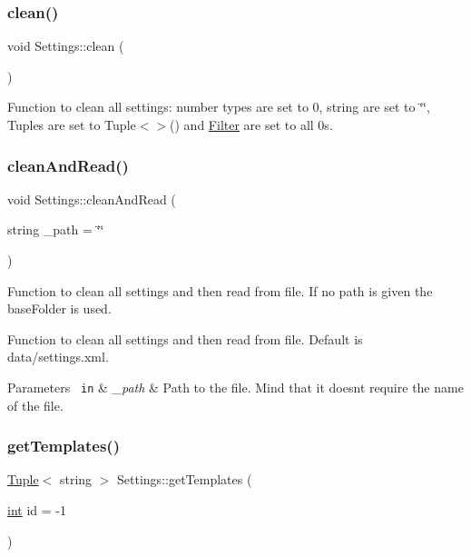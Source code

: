 \subsubsection{\texorpdfstring{clean()}{clean()}}
{\footnotesize\ttfamily void Settings\+::clean (\begin{DoxyParamCaption}{ }\end{DoxyParamCaption})}



Function to clean all settings\+: number types are set to 0, string are set to \char`\"{}\char`\"{}, Tuples are set to Tuple$<$$>$() and \mbox{\hyperlink{class_filter}{Filter}} are set to all 0s. 

\mbox{\label{class_settings_acd13c0d603d94c7c2da58cd92bc955c8}} 
\subsubsection{\texorpdfstring{cleanAndRead()}{cleanAndRead()}}
{\footnotesize\ttfamily void Settings\+::clean\+And\+Read (\begin{DoxyParamCaption}\item[{string}]{\+\_\+path = {\ttfamily \char`\"{}\char`\"{}} }\end{DoxyParamCaption})}



Function to clean all settings and then read from file. If no path is given the base\+Folder is used. 

Function to clean all settings and then read from file. Default is data/settings.\+xml.


\begin{DoxyParams}[1]{Parameters}
\mbox{\texttt{ in}}  & {\em \+\_\+path} & Path to the file. Mind that it doesn\textquotesingle{}t require the name of the file.\\
\hline
\end{DoxyParams}
\mbox{\label{class_settings_af68cb84ba3c8d21e004661fee7c0efe7}} 
\subsubsection{\texorpdfstring{getTemplates()}{getTemplates()}\hspace{0.1cm}{\footnotesize\ttfamily [1/3]}}
{\footnotesize\ttfamily \mbox{\hyperlink{class_tuple}{Tuple}}$<$ string $>$ Settings\+::get\+Templates (\begin{DoxyParamCaption}\item[{\mbox{\hyperlink{draw_8hh_aa620a13339ac3a1177c86edc549fda9b}{int}}}]{id = {\ttfamily -\/1} }\end{DoxyParamCaption})}



